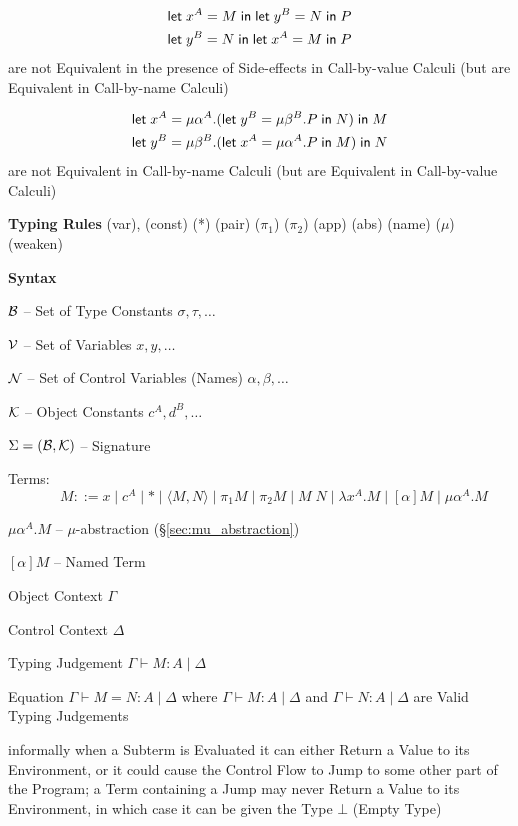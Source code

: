 \begin{align*}
  & \mathsf{let}\;x^A = M\;\mathsf{in}\;\mathsf{let}\;y^B = N\;\mathsf{in}\;P \\
  & \mathsf{let}\;y^B = N\;\mathsf{in}\;\mathsf{let}\;x^A = M\;\mathsf{in}\;P
\end{align*}
are not Equivalent in the presence of Side-effects in Call-by-value
Calculi (but are Equivalent in Call-by-name Calculi)

\begin{align*}
  & \mathsf{let}\;x^A = \mu\alpha^A.
    (\mathsf{let}\;y^B = \mu\beta^B.P\;\mathsf{in}\;N)\;\mathsf{in}\;M \\
  & \mathsf{let}\;y^B = \mu\beta^B.
    (\mathsf{let}\;x^A = \mu\alpha^A.P\;\mathsf{in}\;M)\;\mathsf{in}\;N
\end{align*}
are not Equivalent in Call-by-name Calculi (but are Equivalent in
Call-by-value Calculi)


\textbf{Typing Rules} (var), (const) (*) (pair) ($\pi_1$) ($\pi_2$)
(app) (abs) (name) ($\mu$) (weaken) %


\textbf{Syntax}

$\mathcal{B}$ -- Set of Type Constants $\sigma,\tau,\ldots$

$\mathcal{V}$ -- Set of Variables $x,y,\ldots$

$\mathcal{N}$ -- Set of Control Variables (Names) $\alpha,\beta,\ldots$

$\mathcal{K}$ -- Object Constants $c^A,d^B,\ldots$

$\Sigma = (\mathcal{B},\mathcal{K})$ -- Signature

Terms:
\[
  \quad\quad M ::= x \mid c^A \mid * \mid \langle M,N \rangle
    \mid \pi_1 M \mid \pi_2 M \mid M\;N \mid \lambda x^A.M
    \mid [\alpha]M \mid \mu\alpha^A.M
\]

$\mu\alpha^A.M$ -- $\mu$-abstraction (\S\ref{sec:mu_abstraction})

$[\alpha]M$ -- Named Term

Object Context $\Gamma$

Control Context $\Delta$

Typing Judgement $\Gamma \vdash M:A \mid \Delta$

Equation $\Gamma \vdash M = N : A \mid \Delta$ where $\Gamma \vdash M
: A \mid \Delta$ and $\Gamma \vdash N : A \mid \Delta$ are Valid
Typing Judgements


\asterism


informally when a Subterm is Evaluated it can either Return a Value to
its Environment, or it could cause the Control Flow to Jump to some
other part of the Program; a Term containing a Jump may never Return a
Value to its Environment, in which case it can be given the Type
$\bot$ (Empty Type)

